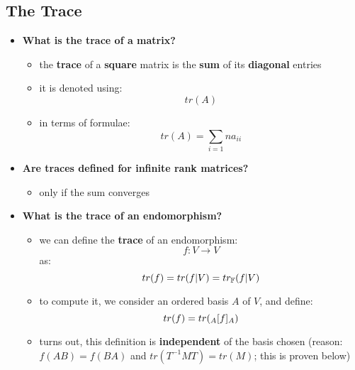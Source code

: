 \documentclass{exam}
\begin{document}
\begin{questions}

\end{questions}

\subsection{The Trace}

\begin{itemize}
    \item \textbf{What is the trace of a matrix?}
    \begin{itemize}
        \item the \textbf{trace} of a \textbf{square} matrix is the \textbf{sum} of its \textbf{diagonal} entries
        \item it is denoted using:
        \[
        tr(A)
        \]
        \item in terms of formulae:
        \[
        tr(A) = \sum_{i = 1}n a_{ii}
        \]
    \end{itemize}
    \item \textbf{Are traces defined for infinite rank matrices?}
    \begin{itemize}
        \item only if the sum converges
    \end{itemize}
    \item \textbf{What is the trace of an endomorphism?}
    \begin{itemize}
        \item we can define the \textbf{trace} of an endomorphism:
        \[
        f : V \to V
        \]
        as:
        \[
        tr(f) = tr(f | V) = tr_\F(f | V)
        \]
        \item to compute it, we consider an ordered basis $A$ of $V$, and define:
        \[
        tr(f) = tr(\cript{f}{A}{A})
        \]
        \item turns out, this definition is \textbf{independent} of the basis chosen (reason: $f(AB) = f(BA)$ and $tr(T^{-1}MT) = tr(M)$; this is proven below)
    \end{itemize}
\end{itemize}
\end{document}
